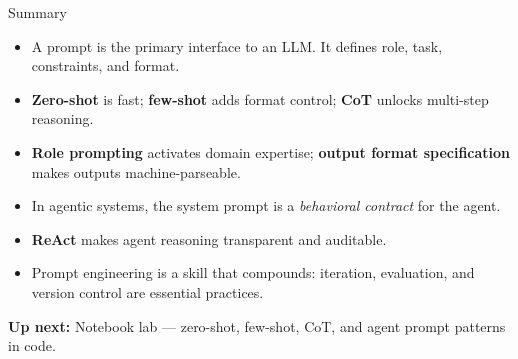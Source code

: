 \documentclass{beamer}
\begin{document}
\begin{frame}{Summary}
    \begin{itemize}
        \item A prompt is the primary interface to an LLM. It defines role, task, constraints, and format.
        \item \textbf{Zero-shot} is fast; \textbf{few-shot} adds format control;
              \textbf{CoT} unlocks multi-step reasoning.
        \item \textbf{Role prompting} activates domain expertise;
              \textbf{output format specification} makes outputs machine-parseable.
        \item In agentic systems, the system prompt is a \emph{behavioral contract} for the agent.
        \item \textbf{ReAct} makes agent reasoning transparent and auditable.
        \item Prompt engineering is a skill that compounds: iteration, evaluation, and version control
              are essential practices.
    \end{itemize}

    \vspace{0.2cm}
    \textbf{Up next:} Notebook lab --- zero-shot, few-shot, CoT, and agent prompt patterns in code.
\end{frame}
\end{document}
